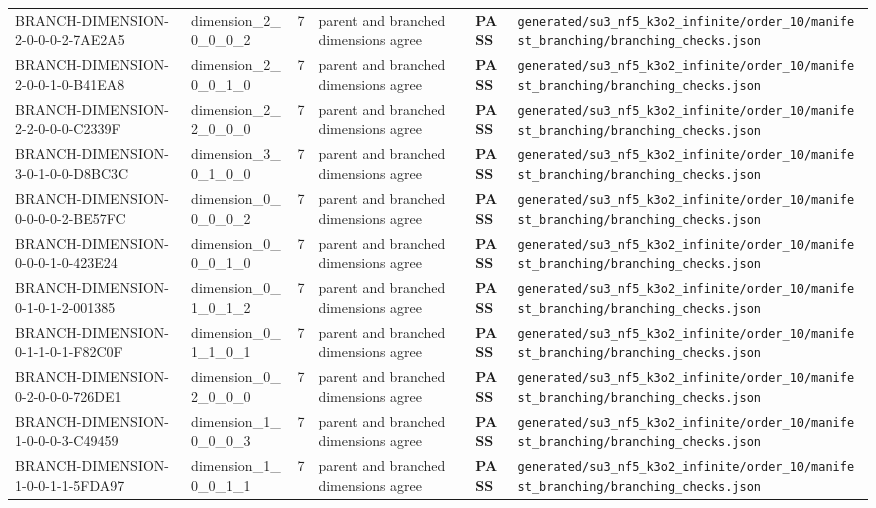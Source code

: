 \documentclass[11pt]{article}
\newcommand{\Pass}{\textcolor{green!50!black}{\textbf{PASS}}}
\newcommand{\RawPath}[1]{\texttt{#1}}
\begin{document}
\begin{longtable}{p{3cm}p{2.5cm}r p{3cm}l p{2cm}}
BRANCH-DIMENSION-2-0-0-0-2-7AE2A5 & dimension\_2\_0\_0\_0\_2 & 7 & parent and branched dimensions agree & \Pass & \RawPath{generated/su3\_nf5\_k3o2\_infinite/order\_10/manifest\_branching/branching\_checks.json}\\
BRANCH-DIMENSION-2-0-0-1-0-B41EA8 & dimension\_2\_0\_0\_1\_0 & 7 & parent and branched dimensions agree & \Pass & \RawPath{generated/su3\_nf5\_k3o2\_infinite/order\_10/manifest\_branching/branching\_checks.json}\\
BRANCH-DIMENSION-2-2-0-0-0-C2339F & dimension\_2\_2\_0\_0\_0 & 7 & parent and branched dimensions agree & \Pass & \RawPath{generated/su3\_nf5\_k3o2\_infinite/order\_10/manifest\_branching/branching\_checks.json}\\
BRANCH-DIMENSION-3-0-1-0-0-D8BC3C & dimension\_3\_0\_1\_0\_0 & 7 & parent and branched dimensions agree & \Pass & \RawPath{generated/su3\_nf5\_k3o2\_infinite/order\_10/manifest\_branching/branching\_checks.json}\\
BRANCH-DIMENSION-0-0-0-0-2-BE57FC & dimension\_0\_0\_0\_0\_2 & 7 & parent and branched dimensions agree & \Pass & \RawPath{generated/su3\_nf5\_k3o2\_infinite/order\_10/manifest\_branching/branching\_checks.json}\\
BRANCH-DIMENSION-0-0-0-1-0-423E24 & dimension\_0\_0\_0\_1\_0 & 7 & parent and branched dimensions agree & \Pass & \RawPath{generated/su3\_nf5\_k3o2\_infinite/order\_10/manifest\_branching/branching\_checks.json}\\
BRANCH-DIMENSION-0-1-0-1-2-001385 & dimension\_0\_1\_0\_1\_2 & 7 & parent and branched dimensions agree & \Pass & \RawPath{generated/su3\_nf5\_k3o2\_infinite/order\_10/manifest\_branching/branching\_checks.json}\\
BRANCH-DIMENSION-0-1-1-0-1-F82C0F & dimension\_0\_1\_1\_0\_1 & 7 & parent and branched dimensions agree & \Pass & \RawPath{generated/su3\_nf5\_k3o2\_infinite/order\_10/manifest\_branching/branching\_checks.json}\\
BRANCH-DIMENSION-0-2-0-0-0-726DE1 & dimension\_0\_2\_0\_0\_0 & 7 & parent and branched dimensions agree & \Pass & \RawPath{generated/su3\_nf5\_k3o2\_infinite/order\_10/manifest\_branching/branching\_checks.json}\\
BRANCH-DIMENSION-1-0-0-0-3-C49459 & dimension\_1\_0\_0\_0\_3 & 7 & parent and branched dimensions agree & \Pass & \RawPath{generated/su3\_nf5\_k3o2\_infinite/order\_10/manifest\_branching/branching\_checks.json}\\
BRANCH-DIMENSION-1-0-0-1-1-5FDA97 & dimension\_1\_0\_0\_1\_1 & 7 & parent and branched dimensions agree & \Pass & \RawPath{generated/su3\_nf5\_k3o2\_infinite/order\_10/manifest\_branching/branching\_checks.json}\\

\end{longtable}
\end{document}
